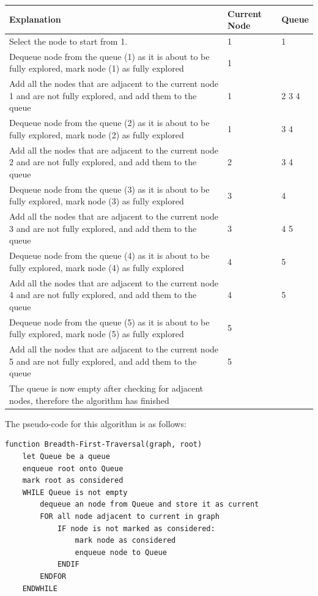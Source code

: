   \begin{table}[H]
  	\begin{tabular}{L{0.8\textwidth} | C{0.1\textwidth} | C{0.1\textwidth}}
  		Explanation & Current Node & Queue\\\hline
  		Select the node to start from 1. & 1 & 1 \\\hline
  		Dequeue node from the queue (1) as it is about to be fully explored, mark node (1) as fully explored & 1 & \\\hline
  		Add all the nodes that are adjacent to the current node 1 and are not fully explored, and add them to the queue & 1 & 2 3 4 \\\hline
  		Dequeue node from the queue (2) as it is about to be fully explored, mark node (2) as fully explored & 1 & 3 4\\\hline
  		Add all the nodes that are adjacent to the current node 2 and are not fully explored, and add them to the queue & 2 & 3 4 \\\hline
  		Dequeue node from the queue (3) as it is about to be fully explored, mark node (3) as fully explored & 3 & 4 \\\hline
  		Add all the nodes that are adjacent to the current node 3 and are not fully explored, and add them to the queue & 3 & 4 5 \\\hline
  		Dequeue node from the queue (4) as it is about to be fully explored, mark node (4) as fully explored & 4 & 5\\\hline
  		Add all the nodes that are adjacent to the current node 4 and are not fully explored, and add them to the queue & 4 & 5 \\\hline
  		Dequeue node from the queue (5) as it is about to be fully explored, mark node (5) as fully explored & 5 & \\\hline
  		Add all the nodes that are adjacent to the current node 5 and are not fully explored, and add them to the queue & 5 & \\\hline
  		The queue is now empty after checking for adjacent nodes, therefore the algorithm has finished & & \\
  	\end{tabular}
  \end{table}
  
  The pseudo-code for this algorithm is as follows:
  
\begin{verbatim}function Breadth-First-Traversal(graph, root)
    let Queue be a queue
    enqueue root onto Queue
    mark root as considered
    WHILE Queue is not empty
        dequeue an node from Queue and store it as current
        FOR all node adjacent to current in graph
            IF node is not marked as considered:
	            mark node as considered
	            enqueue node to Queue
	        ENDIF
	    ENDFOR
	ENDWHILE\end{verbatim}
  
